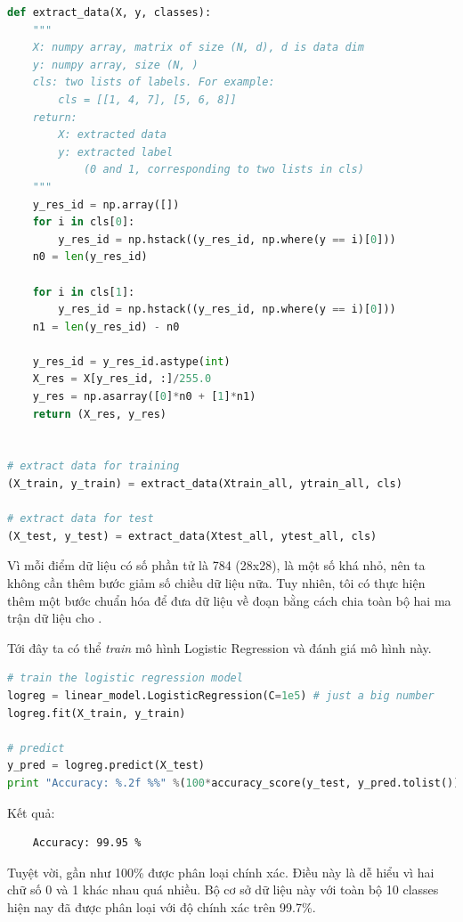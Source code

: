 \begin{lstlisting}[language=Python]
def extract_data(X, y, classes): 
    """ 
    X: numpy array, matrix of size (N, d), d is data dim 
    y: numpy array, size (N, ) 
    cls: two lists of labels. For example:  
        cls = [[1, 4, 7], [5, 6, 8]] 
    return: 
        X: extracted data 
        y: extracted label  
            (0 and 1, corresponding to two lists in cls) 
    """ 
    y_res_id = np.array([]) 
    for i in cls[0]: 
        y_res_id = np.hstack((y_res_id, np.where(y == i)[0])) 
    n0 = len(y_res_id) 
 
    for i in cls[1]: 
        y_res_id = np.hstack((y_res_id, np.where(y == i)[0])) 
    n1 = len(y_res_id) - n0  
 
    y_res_id = y_res_id.astype(int) 
    X_res = X[y_res_id, :]/255.0 
    y_res = np.asarray([0]*n0 + [1]*n1) 
    return (X_res, y_res) 
 
 
# extract data for training  
(X_train, y_train) = extract_data(Xtrain_all, ytrain_all, cls) 
 
# extract data for test  
(X_test, y_test) = extract_data(Xtest_all, ytest_all, cls) 
\end{lstlisting}
 
Vì mỗi điểm dữ liệu có số phần tử là 784 (28x28), là một số khá nhỏ, nên ta không cần thêm bước giảm số chiều dữ liệu nữa. Tuy nhiên, tôi có thực hiện thêm một bước chuẩn hóa để đưa dữ liệu về đoạn \pythoninline{[0, 1]} bằng cách chia toàn bộ hai ma trận dữ liệu cho . 
 
Tới đây ta có thể \textit{train} mô hình Logistic Regression và đánh giá mô hình này.   
 
\begin{lstlisting}[language=Python]
# train the logistic regression model  
logreg = linear_model.LogisticRegression(C=1e5) # just a big number  
logreg.fit(X_train, y_train) 
 
# predict  
y_pred = logreg.predict(X_test) 
print "Accuracy: %.2f %%" %(100*accuracy_score(y_test, y_pred.tolist())) 
\end{lstlisting}
Kết quả:
\begin{lstlisting}
    Accuracy: 99.95 % 
\end{lstlisting}
 
Tuyệt vời, gần như 100\% được phân loại chính xác. Điều này là dễ hiểu vì hai chữ số 0 và 1 khác nhau quá nhiều. Bộ cơ sở dữ liệu này với toàn bộ 10 classes hiện nay đã được phân loại với độ chính xác trên 99.7\%.  
 

